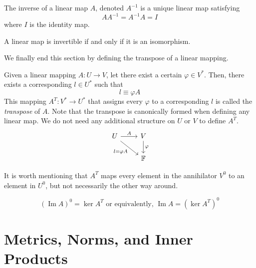 \documentclass{article}
\DeclareMathOperator{\im}{Im}
\begin{document}
    \begin{definition}[Inverse]
      The inverse of a linear map $A$, denoted $A^{-1}$ is a unique linear map satisfying 
      \begin{equation}
        A A^{-1} = A^{-1} A = I
      \end{equation}
      where $I$ is the identity map. 
    \end{definition}

    \begin{corollary}
      A linear map is invertible if and only if it is an isomorphism. 
    \end{corollary}

    We finally end this section by defining the transpose of a linear mapping. 

    \begin{definition}
      Given a linear mapping $A: U \longrightarrow V$, let there exist a certain $\varphi \in V^*$. Then, there exists a corresponding $l \in U^*$ such that 
      \begin{equation}
        l \equiv \varphi A
      \end{equation}
      This mapping $A^T: V^* \longrightarrow U^*$ that assigns every $\varphi$ to a corresponding $l$ is called the \textit{transpose} of $A$. Note that the transpose is canonically formed when defining any linear map. We do not need any additional structure on $U$ or $V$ to define $A^T$.
      \[
        \begin{tikzcd}
          U \arrow{r}{A} \arrow[swap]{dr}{l = \varphi A} & V \arrow{d}{\varphi} \\
          & \mathbb{F}
        \end{tikzcd}
      \]
    \end{definition}

    It is worth mentioning that $A^T$ maps every element in the annihilator $V^0$ to an element in $U^0$, but not necessarily the other way around. 

    \begin{theorem}
      \begin{equation}
        (\im A)^0 = \ker A^T \text{ or equivalently, } \im A = (\ker A^T)^0
      \end{equation}
    \end{theorem}

\section{Metrics, Norms, and Inner Products} 
\end{document}

